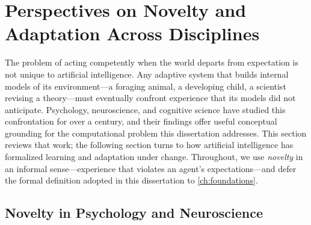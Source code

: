 %   
%
%

\section{Perspectives on Novelty and Adaptation Across Disciplines}
\label{sec:novelty_perspectives}

The problem of acting competently when the world departs from expectation is not unique to artificial intelligence. Any adaptive system that builds internal models of its environment---a foraging animal, a developing child, a scientist revising a theory---must eventually confront experience that its models did not anticipate. Psychology, neuroscience, and cognitive science have studied this confrontation for over a century, and their findings offer useful conceptual grounding for the computational problem this dissertation addresses. This section reviews that work; the following section turns to how artificial intelligence has formalized learning and adaptation under change. Throughout, we use \emph{novelty} in an informal sense---experience that violates an agent's expectations---and defer the formal definition adopted in this dissertation to \cref{ch:foundations}.

\subsection{Novelty in Psychology and Neuroscience}
\label{sec:novelty_psychology}

